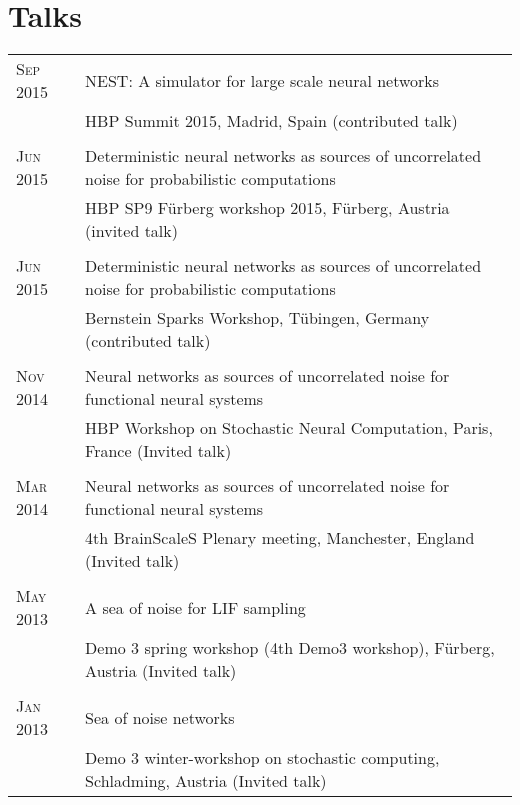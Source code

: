 \documentclass[a4paper,10pt]{article}
\begin{document}
\section{Talks}
\begin{tabular}{>{\hfill}p{1.6cm}|p{}}
  \textsc{Sep} 2015 & NEST: A simulator for large scale neural networks\\
  & \footnotesize HBP Summit 2015, Madrid, Spain (contributed talk)\\
  \multicolumn{2}{c}{} \\
  \textsc{Jun} 2015 & Deterministic neural networks as sources of uncorrelated noise for probabilistic computations\\
  & \footnotesize HBP SP9 F\"urberg workshop 2015, F\"urberg, Austria (invited talk)\\
  \multicolumn{2}{c}{} \\
  \textsc{Jun} 2015 & Deterministic neural networks as sources of uncorrelated noise for probabilistic computations \\
  & \footnotesize Bernstein Sparks Workshop, T\"ubingen, Germany (contributed talk)\\
  \multicolumn{2}{c}{} \\
  \textsc{Nov} 2014 & Neural networks as sources of uncorrelated noise for functional neural systems \\
  & \footnotesize HBP Workshop on Stochastic Neural Computation, Paris, France (Invited talk)\\
  \multicolumn{2}{c}{} \\
  \textsc{Mar} 2014 & Neural networks as sources of uncorrelated noise for functional neural systems \\
  & \footnotesize 4th BrainScaleS Plenary meeting, Manchester, England  (Invited talk)\\
  \multicolumn{2}{c}{} \\
  \textsc{May} 2013 & A sea of noise for LIF sampling \\
  & \footnotesize Demo 3 spring workshop (4th Demo3 workshop), F\"urberg, Austria  (Invited talk)\\
  \multicolumn{2}{c}{} \\
  \textsc{Jan} 2013 & Sea of noise networks \\
  & \footnotesize Demo 3 winter-workshop on stochastic computing, Schladming, Austria (Invited talk)\\
\end{tabular}
\end{document}
